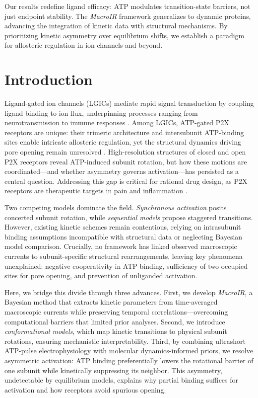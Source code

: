 \documentclass[pdflatex,sn-mathphys-num]{sn-jnl}%
\theoremstyle{thmstyleone}%
\theoremstyle{thmstyletwo}%
\theoremstyle{thmstylethree}%
\begin{document}
Our results redefine ligand efficacy: ATP modulates transition-state barriers, not just endpoint stability. The \textit{MacroIR} framework generalizes to dynamic proteins, advancing the integration of kinetic data with structural mechanisms. By prioritizing kinetic asymmetry over equilibrium shifts, we establish a paradigm for allosteric regulation in ion channels and beyond.

\section{Introduction}
\label{sec1}

Ligand-gated ion channels (LGICs) mediate rapid signal transduction by coupling ligand binding to ion flux, underpinning processes ranging from neurotransmission to immune responses \cite{p2x_cuerpo_humano,p2x_drugs}. Among LGICs, ATP-gated P2X receptors are unique: their trimeric architecture and intersubunit ATP-binding sites enable intricate allosteric regulation, yet the structural dynamics driving pore opening remain unresolved \cite{cerrada_p2x,abierta_p2x}. High-resolution structures of closed and open P2X receptors \cite{estructura_p2x1} reveal ATP-induced subunit rotation, but how these motions are coordinated—and whether asymmetry governs activation—has persisted as a central question. Addressing this gap is critical for rational drug design, as P2X receptors are therapeutic targets in pain and inflammation \cite{therapeutic,p2x7_pharmacology}.

Two competing models dominate the field. \textit{Synchronous activation} posits concerted subunit rotation, while \textit{sequential models} propose staggered transitions. However, existing kinetic schemes remain contentious, relying on intrasubunit binding assumptions incompatible with structural data \cite{Moffatt_hume} or neglecting Bayesian model comparison. Crucially, no framework has linked observed macroscopic currents to subunit-specific structural rearrangements, leaving key phenomena unexplained: negative cooperativity in ATP binding, sufficiency of two occupied sites for pore opening, and prevention of unliganded activation.

Here, we bridge this divide through three advances. First, we develop \textit{MacroIR}, a Bayesian method that extracts kinetic parameters from time-averaged macroscopic currents while preserving temporal correlations—overcoming computational barriers that limited prior analyses. Second, we introduce \textit{conformational models}, which map kinetic transitions to physical subunit rotations, ensuring mechanistic interpretability. Third, by combining ultrashort ATP-pulse electrophysiology \cite{Moffatt_hume} with molecular dynamics-informed priors, we resolve asymmetric activation: ATP binding preferentially lowers the rotational barrier of one subunit while kinetically suppressing its neighbor. This asymmetry, undetectable by equilibrium models, explains why partial binding suffices for activation and how receptors avoid spurious opening.
\end{document}
